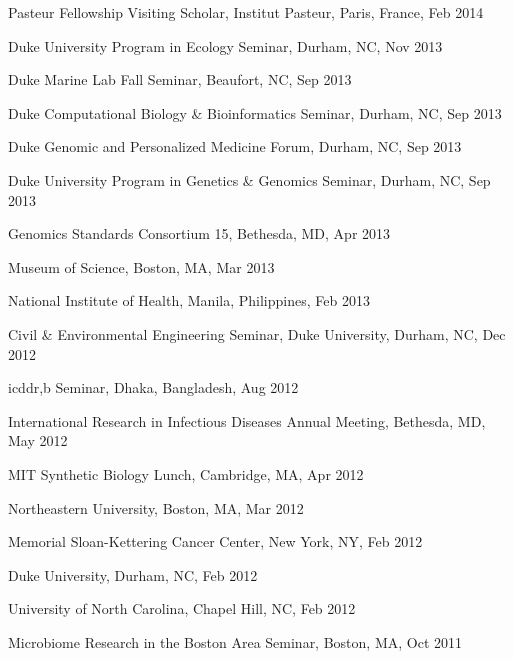 \documentclass[overlapped,line,11pt]{res}
\begin{document}
\begin{resume}
\begin{revnumerate}[50]
\item {Pasteur Fellowship Visiting Scholar, Institut Pasteur,
  Paris, France, Feb 2014}

\item {Duke University Program in Ecology Seminar,
  Durham, NC, Nov 2013}

\item {Duke Marine Lab Fall Seminar,
  Beaufort, NC, Sep 2013}

\item {Duke Computational Biology \& Bioinformatics Seminar,
  Durham, NC, Sep 2013}

\item {Duke Genomic and Personalized Medicine Forum,
  Durham, NC, Sep 2013}

\item {Duke University Program in Genetics \& Genomics Seminar,
  Durham, NC, Sep 2013}

\item {Genomics Standards Consortium 15,
  Bethesda, MD, Apr 2013}

\item {Museum of Science, Boston,
  MA, Mar 2013}

\item {National Institute of Health, Manila,
  Philippines, Feb 2013}

\item {Civil \& Environmental Engineering Seminar, Duke University,
  Durham, NC, Dec 2012}

\item {icddr,b Seminar, Dhaka,
  Bangladesh, Aug 2012}

\item {International Research in
  Infectious Diseases Annual Meeting, Bethesda, MD, May 2012}

\item {MIT Synthetic Biology Lunch, Cambridge, MA, Apr 2012}

\item {Northeastern University, Boston, MA, Mar 2012}

\item {Memorial Sloan-Kettering Cancer Center, New York, NY,
  Feb 2012}

\item {Duke University, Durham, NC, Feb 2012}

\item {University of North Carolina, Chapel Hill, NC, Feb 2012}

\item {Microbiome Research
  in the Boston Area Seminar, Boston, MA, Oct 2011}


\end{revnumerate}
\end{resume}
\end{document}
